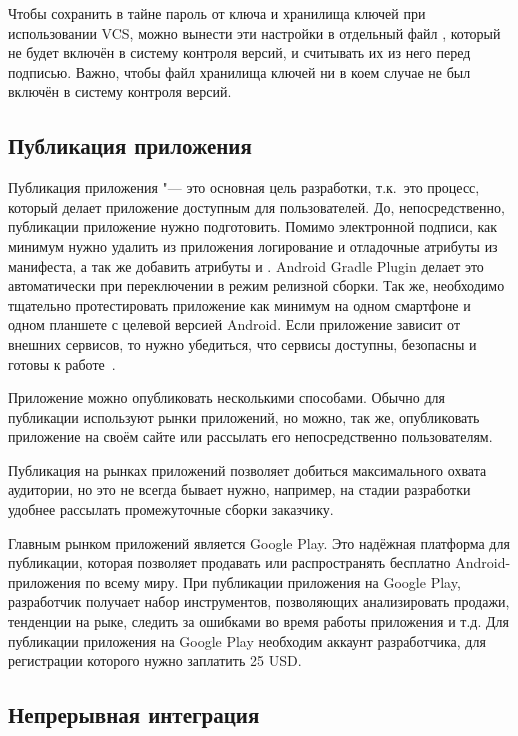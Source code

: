 Чтобы сохранить в тайне пароль от ключа и хранилища ключей при использовании VCS, можно вынести эти настройки в отдельный файл , который не будет включён в систему контроля версий, и считывать их из него перед подписью.
Важно, чтобы файл хранилища ключей ни в коем случае не был включён в систему контроля версий.

\subsection{Публикация приложения}
\label{subsec:publish}

Публикация приложения "--- это основная цель разработки, т.к.\ это процесс, который делает приложение доступным для пользователей.
До, непосредственно, публикации приложение нужно подготовить.
Помимо электронной подписи, как минимум нужно удалить из приложения логирование  и отладочные атрибуты из манифеста, а так же добавить атрибуты  и .
Android Gradle Plugin делает это автоматически при переключении в режим релизной сборки.
Так же, необходимо тщательно протестировать приложение как минимум на одном смартфоне и одном планшете с целевой версией Android.
Если приложение зависит от внешних сервисов, то нужно убедиться, что сервисы доступны, безопасны и готовы к работе~\cite{android:publish}.

Приложение можно опубликовать несколькими способами.
Обычно для публикации используют рынки приложений, но можно, так же, опубликовать приложение на своём сайте или рассылать его непосредственно пользователям.

Публикация на рынках приложений позволяет добиться максимального охвата аудитории, но это не всегда бывает нужно, например, на стадии разработки удобнее рассылать промежуточные сборки заказчику.

Главным рынком приложений является Google Play.
Это надёжная платформа для публикации, которая позволяет продавать или распространять бесплатно Android-приложения по всему миру.
При публикации приложения на Google Play, разработчик получает набор инструментов, позволяющих анализировать продажи, тенденции на рыке, следить за ошибками во время работы приложения и т.д.
Для публикации приложения на Google Play необходим аккаунт разработчика, для регистрации которого нужно заплатить 25 USD\@.

\subsection{Непрерывная интеграция}
\label{subsec:ci}

